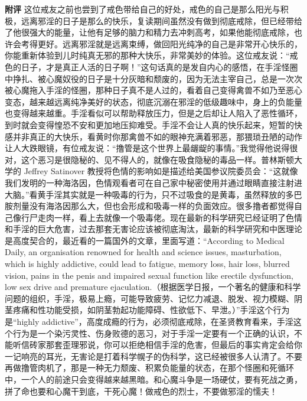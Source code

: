 \begin{case}
    \textbf{附评} 这位戒友之前也尝到了戒色带给自己的好处，戒色的自己是那么阳光与积极，远离邪淫的日子是那么的快乐，复读期间虽然没有做到彻底戒除，但已经带给了他很强大的能量，让他有足够的脑力和精力去冲刺高考，如果他能彻底戒除，也许会考得更好。远离邪淫就是远离束缚，做回阳光纯净的自己是非常开心快乐的，你能重新体验到儿时纯真无邪的那种大快乐，非常美妙的体验。这位戒友说：“戒色的日子，才是真正人活的日子啊！”这句话真的是发自内心的感悟，在手淫怪圈中挣扎、被心魔奴役的日子是十分灰暗和颓废的，因为无法主宰自己，总是一次次被心魔拖入手淫的怪圈，那种日子真不是人过的，看着自己变得禽兽不如乃至恶心变态，越来越远离纯净美好的状态，彻底沉溺在邪淫的低级趣味中，身上的负能量也变得越来越重。手淫看似可以帮助释放压力，但是之后却让人陷入了恶性循环，到时就会变得惶恐不安和更加地压抑难受。手淫不会让人真的快乐起来，短暂的快感并非真正的大快乐，看黄时你那禽兽不如的眼神充满着邪恶，那猥琐丑陋的动作让人大跌眼镜，有位戒友说：“撸管是这个世界上最龌龊的事情。”我觉得他说得很对，这个恶习是很隐秘的、见不得人的，就像在吸食隐秘的毒品一样。普林斯顿大学的 Jeffrey Satinover 教授将色情的影响如是描述给美国参议院委员会：“这就像我们发明的一种海洛因，色情观看者可在自己家中秘密使用并通过眼睛直接注射进大脑。”看黄手淫其实就是一种吸毒的行为，只不过吸食的是黄毒，虽然释放的多巴胺剂量没有海洛因那么大，但也会形成和吸毒一样的负面效应。很多撸者都觉得自己像行尸走肉一样，看上去就像一个吸毒佬。现在最新的科学研究已经证明了色情和手淫的巨大危害，过去那套无害论应该被彻底淘汰，最新的科学研究和中医理论是高度契合的，最近看的一篇国外的文章，里面写道：“According to Medical Daily, an organisation renowned for health and science issues, masturbation, which is highly addictive, could lead to fatigue, memory loss, hair loss, blurred vision, pains in the penis and impaired sexual function like erectile dysfunction, low sex drive and premature ejaculation.（根据医学日报，一个著名的健康和科学问题的组织，手淫，极易上瘾，可能导致疲劳、记忆力减退、脱发、视力模糊、阴茎疼痛和性功能受损，如阴茎勃起功能障碍、性欲低下、早泄。）”手淫这个行为是“highly addictive”，高度成瘾的行为，必须彻底戒除，在圣贤教育看来，手淫这个行为是一个染污灵性、伤身败德的恶习，对于手淫一定要有一个正确的认识，不能听信砖家那套歪理邪说，你可以拒绝相信手淫的危害，但最后的事实肯定会给你一记响亮的耳光，无害论是打着科学幌子的伪科学，这已经被很多人认清了。不要再做撸管肉机了，那是一种无力颓废、积累负能量的状态，在那个怪圈和死循环中，一个人的前途只会变得越来越黑暗。和心魔斗争是一场硬仗，要有死战之勇，拼了命也要和心魔干到底，干死心魔！做戒色的烈士，不要做邪淫的懦夫！
\end{case}

